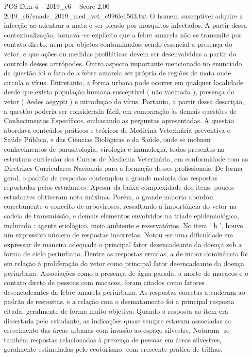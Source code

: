 \begin{textsample}{POS Dim 4 – 2019\_c6 – Score 2.00 – 2019\_c6/enade\_2019\_med\_vet\_c996fe1563.txt}
O homem susceptível adquire a infecção ao adentrar a mata e ser picado por mosquitos infectados.
A partir dessa contextualização, tornava -se explícito que a febre amarela não se transmite por contato direto, nem por objetos contaminados, sendo essencial a presença do vetor, e que ações ou medidas profiláticas devem ser desenvolvidas a partir do controle desses artrópodes.
Outro aspecto importante mencionado no enunciado da questão foi o fato de a febre amarela ser própria de regiões de mata onde circula o vírus.
Entretanto, a forma urbana pode ocorrer em qualquer localidade desde que exista população humana susceptível ( não vacinada ), presença do vetor ( Aedes aegypti ) e introdução do vírus.
Portanto, a partir dessa descrição, a questão poderia ser considerada fácil, em comparação às demais questões de Conhecimentos Específicos, embasando as perguntas apresentadas.
A questão abordava conteúdos práticos e teóricos de Medicina Veterinária preventiva e Saúde Pública, e das Ciências Biológicas e da Saúde, onde se incluem conhecimentos de parasitologia, virologia e imunologia, todos presentes na estrutura curricular dos Cursos de Medicina Veterinária, em conformidade com as Diretrizes Curriculares Nacionais para a formação desses profissionais.
De forma geral, o padrão de respostas contemplou a grande maioria das respostas reportadas pelos estudantes.
Apesar da baixa complexidade dos itens, poucos estudantes obtiveram nota máxima.
Porém, a grande maioria abordou corretamente o conceito de arboviroses, ressaltando a importância do vetor na cadeia de transmissão, e demais elementos envolvidos na tríade epidemiológica, incluindo : agente etiológico, meio ambiente e reservatórios.
No item ‘ b ’, houve um expressivo número de respostas incorretas.
Notou -se uma dificuldade em expressar de maneira adequada o principal fator desencadeante da doença sob a forma de ciclo periurbano.
Dentre as respostas erradas, a de maior dominância foi em relação à proliferação do vetor como principal fator desencadeante da doença periurbana.
Associações como a presença de água parada, a morte de macacos e o contato direto de pessoas com macacos, foram citados como fatores desencadeantes da febre amarela periurbana.
As respostas corretas atenderam ao padrão de respostas, e a relação com o desmatamento foi a principal resposta citada, geralmente de forma muito objetiva.
Quando a resposta ao item era dissertada pelo estudante, as indicações quase sempre estavam associadas ao crescimento das áreas urbanas com invasão ao espaço silvestre.
Notaram -se também respostas relacionadas à presença de pessoas em áreas silvestres, geralmente estimuladas pelo ecoturismo, com crescente prática de trilhas.

\end{textsample}
